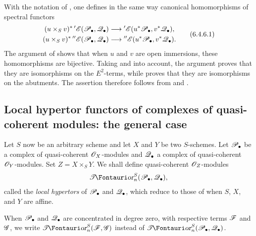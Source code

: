 \begin{env}[6.4.6]
\label{III.6.4.6}
With the notation of , one defines in the same way
canonical homomorphisms of spectral functors
\[
  \begin{aligned}
  (u\times_Sv)^*\,{}'\mathscr{E}(\mathscr{P}_\bullet,\mathscr{Q}_\bullet)
  &\longrightarrow
  {}'\mathscr{E}(u^*\mathscr{P}_\bullet,v^*\mathscr{Q}_\bullet),\\
  (u\times_Sv)^*\,{}''\mathscr{E}(\mathscr{P}_\bullet,\mathscr{Q}_\bullet)
  &\longrightarrow
  {}''\mathscr{E}(u^*\mathscr{P}_\bullet,v^*\mathscr{Q}_\bullet).
  \end{aligned}
  \tag{6.4.6.1}\label{III.6.4.6.1}
\]
The argument of  shows that when $u$ and $v$ are
open immersions, these homomorphisms are bijective.  Taking
 and  into account, the
argument proves that they are isomorphisms on the $E^2$-terms,
while  proves that they are isomorphisms on the
abutments.  The assertion therefore follows from
 and .
\end{env}


\subsection{Local hypertor functors of complexes of quasi-coherent modules: the general case}
\label{subsection:III.6.5}

\begin{env}[6.5.1]
\label{III.6.5.1}
Let $S$ now be an arbitrary scheme and let $X$ and $Y$ be two
$S$-schemes.  Let $\mathscr{P}_\bullet$ be a complex of quasi-coherent
$\mathscr{O}_X$-modules and $\mathscr{Q}_\bullet$ a complex of quasi-coherent
$\mathscr{O}_Y$-modules.  Set $Z=X\times_SY$.  We shall define
quasi-coherent $\mathscr{O}_Z$-modules
\[
  \shTor_n^S(\sh P_\bullet,\sh Q_\bullet),
\]
called the \emph{local hypertors} of $\mathscr{P}_\bullet$ and
$\mathscr{Q}_\bullet$, which reduce to those of  when
$S$, $X$, and $Y$ are affine.

When $\mathscr{P}_\bullet$ and $\mathscr{Q}_\bullet$ are concentrated in
degree zero, with respective terms $\mathscr{F}$ and $\mathscr{G}$, we write
$\shTor_n^S(\sh F,\sh G)$ instead of
$\shTor_n^S(\sh P_\bullet,\sh Q_\bullet)$.
\end{env}

